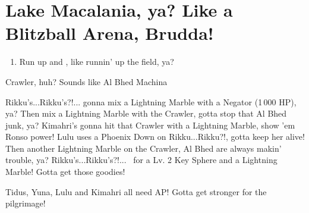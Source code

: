 \chapter{Lake Macalania, ya? Like a Blitzball Arena, Brudda!}

\begin{enumerate}
    \item Run up and \sd, like runnin' up the field, ya?
\end{enumerate}
\begin{battle}[16000]{Crawler, huh? Sounds like Al Bhed Machina}
    \begin{itemize}
        \switch{\tidus}{\rikku}
        \rikkuf Rikku's...Rikku's?!... gonna mix a Lightning Marble with a Negator (1\,000 HP), ya?
        \rikkuf Then mix a Lightning Marble with the Crawler, gotta stop that Al Bhed junk, ya?
        \kimahrif Kimahri's gonna hit that Crawler with a Lightning Marble, show 'em Ronso power!
        \luluf Lulu uses a Phoenix Down on Rikku...Rikku?!, gotta keep her alive!
        \rikkuf Then another Lightning Marble on the Crawler, Al Bhed are always makin' trouble, ya?
        \rikkuf Rikku's...Rikku's?!... \od\ for a Lv. 2 Key Sphere and a Lightning Marble! Gotta get those goodies!
    \end{itemize}
    Tidus, Yuna, Lulu and Kimahri all need AP! Gotta get stronger for the pilgrimage!
\end{battle}
